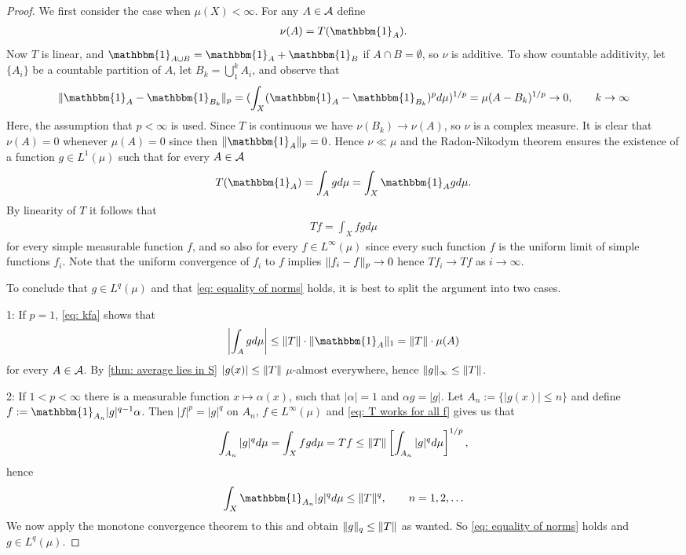 \begin{proof}
We first consider the case when $\mu(X)<\infty$. For any $A\in \mathcal{A}$ define
\begin{align*}
	\nu(A)=T(\mathbbm{1}_{A}).
\end{align*}
Now $T$ is linear, and $\mathbbm{1}_{A\cup B}=\mathbbm{1}_{A}+\mathbbm{1}_{B}$ if $A\cap B=\emptyset$, so $\nu$ is additive. To show countable additivity, let $\{A_{i}\}$ be a countable partition of $A$, let $B_{k}=\bigcup_{1}^{k}A_{i}$, and observe that
\begin{align*}
	\n{\mathbbm{1}_{A} -  \mathbbm{1}_{B_{k}} }_{p}=(\int_{X}(\mathbbm{1}_{A} -  \mathbbm{1}_{B_{k}})^{p}d\mu)^{1/p}=\mu(A-B_{k})^{1/p}\to 0, \qquad k\to \infty
\end{align*}
Here, the assumption that $p<\infty$ is used. Since $T$ is continuous we have $\nu(B_{k})\to \nu(A)$, so $\nu$ is a complex measure. It is clear that $\nu(A)=0$ whenever $\mu(A)=0$ since then $\n{\mathbbm{1}_{A}}_{p}=0$. Hence $\nu \ll \mu$ and the Radon-Nikodym theorem ensures the existence of a function $g\in L^{1}(\mu)$  such that for every $A\in \mathcal{A}$
\begin{align}
	T(\mathbbm{1}_{A})=\int_{A}gd\mu=\int_{X}\mathbbm{1}_{A}gd\mu. \label{eq: kfa}
\end{align}
By linearity of $T$ it follows that 
\begin{align}
	Tf=\int_{X}fgd\mu \label{eq: T works for all f}
\end{align}
for every simple measurable function $f$, and so also for every $f\in L^{\infty}(\mu)$ since every such function $f$ is the uniform limit of simple functions $f_{i}$. Note that the uniform convergence of $f_{i}$ to $f$ implies $\Vert{f_{i}-f}\Vert_{p}\to 0$ hence $Tf_{i}\to Tf$ as $i\to \infty$.

To conclude that $g\in L^{q}(\mu)$ and that \eqref{eq: equality of norms} holds, it is best to split the argument into two cases.

1: If $p=1$, \eqref{eq: kfa} shows that
\begin{align*}
	\left| \int_{A}gd\mu\right| \le \n{T}\cdot \n{\mathbbm{1}_{A}}_{1}=\n{T}\cdot\mu(A)
\end{align*}
for every $A\in \mathcal{A}$. By \cref{thm: average lies in S} $|g(x)|\le \Vert{T}\Vert$ $\mu$-almost everywhere, hence $\Vert{g}\Vert_{\infty}\le \Vert{T}\Vert$.

2: If $1<p<\infty$ there is a measurable function $x\mapsto \alpha(x)$, such that $|\alpha|=1$ and $\alpha g=|g|$. Let $A_{n}:=\{|g(x)|\le n\}$ and define $f:=\mathbbm{1}_{A_{n}}|g|^{q-1}\alpha$. Then $|f|^{p}=|g|^{q}$ on $A_{n}$, $f\in L^{\infty}(\mu)$ and \eqref{eq: T works for all f} gives us that
\begin{align*}
	\int_{A_{n}}|g|^{q}d\mu=\int_{X}fgd\mu=Tf\le \Vert{T}\Vert\left[ \int_{A_{n}}|g|^{q}d\mu \right]^{1/p},
\end{align*}
hence
\begin{align*}
	\int_{X}\mathbbm{1}_{A_{n}}|g|^{q}d\mu \le \n{T}^{q}, \qquad n=1,2, \dots
\end{align*}
We now apply the monotone convergence theorem to this and obtain $\Vert{g}\Vert_{q}\le \Vert{T}\Vert$ as wanted. So \eqref{eq: equality of norms} holds and $g\in L^{q}(\mu)$.


\end{proof}
